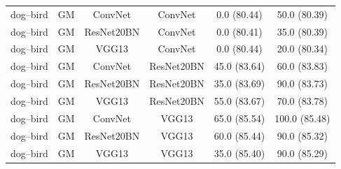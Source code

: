 \begin{table}[t]
{\begin{tabular}{llcccc}
\midrule

dog--bird & GM &
ConvNet & ConvNet & 0.0 \small{(80.44)} & 50.0 \small{(80.39)} \\
dog--bird & GM &
ResNet20BN & ConvNet & 0.0 \small{(80.41)} & 35.0 \small{(80.39)} \\
dog--bird & GM &
VGG13 & ConvNet & 0.0 \small{(80.44)} & 20.0 \small{(80.34)} \\

\addlinespace
dog--bird & GM &
ConvNet & ResNet20BN & 45.0 \small{(83.64)} & 60.0 \small{(83.83)} \\
dog--bird & GM &
ResNet20BN & ResNet20BN & 35.0 \small{(83.69)} & 90.0 \small{(83.73)} \\
dog--bird & GM &
VGG13 & ResNet20BN & 55.0 \small{(83.67)} & 70.0 \small{(83.78)} \\

\addlinespace
dog--bird & GM &
ConvNet & VGG13 & 65.0 \small{(85.54)} & 100.0 \small{(85.48)} \\
dog--bird & GM &
ResNet20BN & VGG13 & 60.0 \small{(85.44)} & 90.0 \small{(85.32)} \\
dog--bird & GM &
VGG13 & VGG13 & 35.0 \small{(85.40)} & 90.0 \small{(85.29)} \\

\bottomrule
\end{tabular}
}
\end{table}
